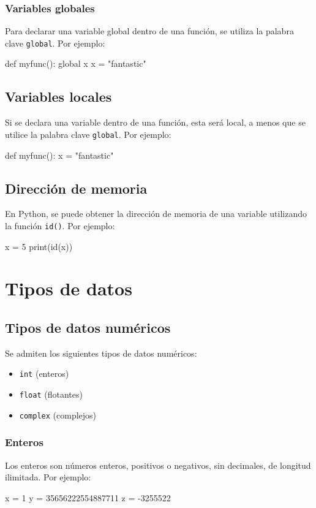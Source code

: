 \documentclass{article}
\begin{document}
\subsubsection{Variables globales}
Para declarar una variable global dentro de una función, se utiliza la palabra clave \texttt{global}. Por ejemplo:
\begin{python_code}
def myfunc():
  global x
  x = "fantastic"
\end{python_code}
\subsection{Variables locales}
Si se declara una variable dentro de una función, esta será local, a menos que se utilice la palabra clave \texttt{global}. Por ejemplo:
\begin{python_code}
def myfunc():
  x = "fantastic"
\end{python_code}

\subsection{Dirección de memoria}
En Python, se puede obtener la dirección de memoria de una variable utilizando la función \texttt{id()}. Por ejemplo:
\begin{python_code}
x = 5
print(id(x))
\end{python_code}
\section{Tipos de datos}
\subsection{Tipos de datos numéricos}
Se admiten los siguientes tipos de datos numéricos:
\begin{itemize}
    \item \texttt{int} (enteros)
    \item \texttt{float} (flotantes)
    \item \texttt{complex} (complejos)
\end{itemize}
\subsubsection{Enteros}
Los enteros son números enteros, positivos o negativos, sin decimales, de longitud ilimitada. Por ejemplo:
\begin{python_code}
x = 1
y = 35656222554887711
z = -3255522
\end{python_code}
\end{document}
